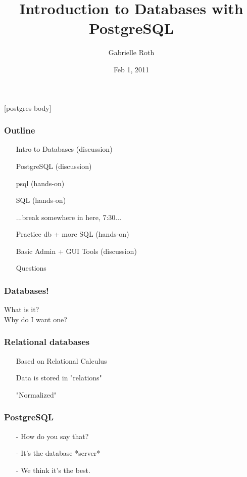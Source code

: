 \documentclass[20pt]{beamer}
\title{Introduction to Databases with PostgreSQL}
\author{Gabrielle Roth}
\institute{PDXPUG \& FreeGeek}
\date{Feb 1, 2011}
\begin{document}
\frame{
    \titlepage
}

[postgres body]

\frame
{
    \frametitle{Outline}
    \begin{itemize}
    \item[] Intro to Databases (discussion)
    \item[] PostgreSQL (discussion)
    \item[] psql (hands-on)
    \item[] SQL (hands-on)
    \item[] ...break somewhere in here, 7:30...
    \item[] Practice db + more SQL (hands-on)
    \item[] Basic Admin + GUI Tools (discussion)
    \item[] Questions
    \end{itemize}
}


\frame
{
    \frametitle{Databases!}
    \begin{center}
    What is it?\\
    Why do I want one?
    \end{center}
}

\frame
{
    \frametitle{Relational databases}
    \begin{itemize}
    \item[] Based on Relational Calculus
    \item[] Data is stored in "relations"
    \item[] "Normalized"
    \end{itemize}
}

\frame
{
    \frametitle{PostgreSQL}
    \begin{itemize}
    \item[-] How do you say that?
    \item[-] It's the database *server*
    \item[-] We think it's the best.
    \end{itemize}
}
\end{document}
